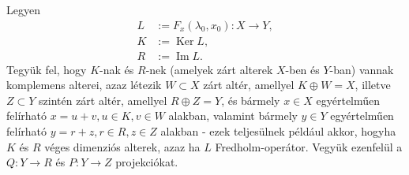 \documentclass[oneside, titlepage, 12pt, a4paper]{report}
\DeclareMathOperator{\Ima}{Im}	%
\DeclareMathOperator{\Ker}{Ker}	%
\begin{document}
Legyen
\begin{align*}
L &:= F_x(\lambda_0, x_0) : X \rightarrow Y, \\
K &:= \Ker L, \\
R &:= \Ima L.
\end{align*}
Tegyük fel, hogy $K$-nak és $R$-nek (amelyek zárt alterek $X$-ben és $Y$-ban) vannak komplemens alterei, azaz létezik $W \subset X$ zárt altér, amellyel $K \oplus W = X$, illetve $Z \subset Y$ szintén zárt altér, amellyel $R \oplus Z = Y$, és bármely $x \in X$ egyértelműen felírható $x = u + v, u \in K, v \in W$ alakban, valamint bármely $y \in Y$ egyértelműen felírható $y = r + z, r \in R, z \in Z$ alakban - ezek teljesülnek például akkor, hogyha $K$ és $R$ véges dimenziós alterek, azaz ha $L$ Fredholm-operátor. Vegyük ezenfelül a $Q : Y \rightarrow R$ és $P : Y \rightarrow Z$ projekciókat.
\end{document}
